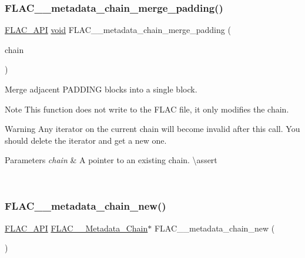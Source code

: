 \subsubsection{\texorpdfstring{FLAC\_\_metadata\_chain\_merge\_padding()}{FLAC\_\_metadata\_chain\_merge\_padding()}}
{\footnotesize\ttfamily \mbox{\hyperlink{group__flac__export_ga56ca07df8a23310707732b1c0007d6f5}{F\+L\+A\+C\+\_\+\+A\+PI}} \mbox{\hyperlink{_s_d_l__opengles2__gl2ext_8h_ae5d8fa23ad07c48bb609509eae494c95}{void}} F\+L\+A\+C\+\_\+\+\_\+metadata\+\_\+chain\+\_\+merge\+\_\+padding (\begin{DoxyParamCaption}\item[{\mbox{\hyperlink{group__flac__metadata__level2_gaec6993c60b88f222a52af86f8f47bfdf}{F\+L\+A\+C\+\_\+\+\_\+\+Metadata\+\_\+\+Chain}} $\ast$}]{chain }\end{DoxyParamCaption})}

Merge adjacent P\+A\+D\+D\+I\+NG blocks into a single block.

\begin{DoxyNote}{Note}
This function does not write to the F\+L\+AC file, it only modifies the chain.
\end{DoxyNote}
\begin{DoxyWarning}{Warning}
Any iterator on the current chain will become invalid after this call. You should delete the iterator and get a new one.
\end{DoxyWarning}

\begin{DoxyParams}{Parameters}
{\em chain} & A pointer to an existing chain. \textbackslash{}assert 
\begin{DoxyCode}{1}
\end{DoxyCode}
 \\
\hline
\end{DoxyParams}
\mbox{\label{group__flac__metadata__level2_gafd1f4f58af29325b067ebc5dc34a0f69}} 
\subsubsection{\texorpdfstring{FLAC\_\_metadata\_chain\_new()}{FLAC\_\_metadata\_chain\_new()}}
{\footnotesize\ttfamily \mbox{\hyperlink{group__flac__export_ga56ca07df8a23310707732b1c0007d6f5}{F\+L\+A\+C\+\_\+\+A\+PI}} \mbox{\hyperlink{group__flac__metadata__level2_gaec6993c60b88f222a52af86f8f47bfdf}{F\+L\+A\+C\+\_\+\+\_\+\+Metadata\+\_\+\+Chain}}$\ast$ F\+L\+A\+C\+\_\+\+\_\+metadata\+\_\+chain\+\_\+new (\begin{DoxyParamCaption}\item[{\mbox{\hyperlink{_s_d_l__opengles2__gl2ext_8h_ae5d8fa23ad07c48bb609509eae494c95}{void}}}]{ }\end{DoxyParamCaption})}

